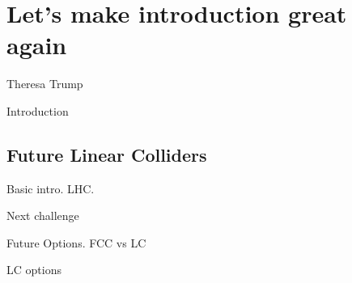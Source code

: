 \chapter{Let's make introduction great again}
\label{chap:SomeStuff}



%
{Theresa Trump}%

Introduction 

\section{Future Linear Colliders}

Basic intro. LHC. 

Next challenge

Future Options. FCC vs LC

LC options


